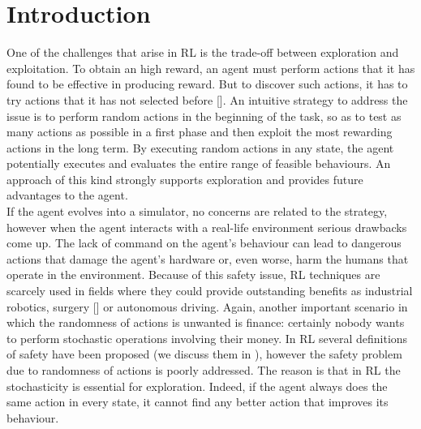 \chapter{Introduction}

One of the challenges that arise in \acf{RL} is the trade-off between exploration and exploitation. To obtain an high reward, an agent must perform actions that it has found to be effective in producing reward. But to discover such actions, it has to try actions that it has not selected before [\cite{sutton2018reinforcement}]. An intuitive strategy to address the issue is to perform random actions in the beginning of the task, so as to test as many actions as possible in a first phase and then exploit the most rewarding actions in the long term. By executing random actions in any state, the agent potentially executes and evaluates the entire range of feasible behaviours. An approach of this kind strongly supports exploration and provides future advantages to the agent.\\
\newline
If the agent evolves into a simulator, no concerns are related to the strategy, however when the agent interacts with a real-life environment serious drawbacks come up. The lack of command on the agent's behaviour can lead to dangerous actions that damage the agent's hardware or, even worse, harm the humans that operate in the environment. Because of this safety issue, \ac{RL} techniques are scarcely used in fields where they could provide outstanding benefits as industrial robotics, surgery [\cite{baek2018PathPlanning}] or autonomous driving. Again, another important scenario in which the randomness of actions is unwanted is finance: certainly nobody wants to perform stochastic operations involving their money. In \ac{RL} several definitions of safety have been proposed (we discuss them in ), however the safety problem due to randomness of actions is poorly addressed. The reason is that in \ac{RL} the stochasticity is essential for exploration. Indeed, if the agent always does the same action in every state, it cannot find any better action that improves its behaviour.\\
\newline
